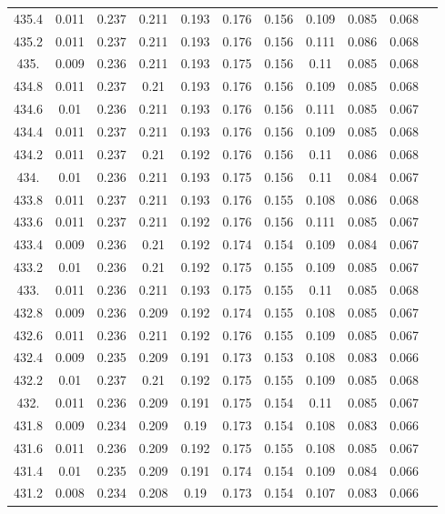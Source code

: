 \documentclass[12pt]{ctexart}
\numberwithin{equation}{section}
\begin{document}
\begin{longtable}{ccccccccccc}
435.4	&	0.011	&	0.237	&	0.211	&	0.193	&	0.176	&	0.156	&	0.109	&	0.085	&	0.068	\\
435.2	&	0.011	&	0.237	&	0.211	&	0.193	&	0.176	&	0.156	&	0.111	&	0.086	&	0.068	\\
435.	&	0.009	&	0.236	&	0.211	&	0.193	&	0.175	&	0.156	&	0.11	&	0.085	&	0.068	\\
434.8	&	0.011	&	0.237	&	0.21	&	0.193	&	0.176	&	0.156	&	0.109	&	0.085	&	0.068	\\
434.6	&	0.01	&	0.236	&	0.211	&	0.193	&	0.176	&	0.156	&	0.111	&	0.085	&	0.067	\\
434.4	&	0.011	&	0.237	&	0.211	&	0.193	&	0.176	&	0.156	&	0.109	&	0.085	&	0.068	\\
434.2	&	0.011	&	0.237	&	0.21	&	0.192	&	0.176	&	0.156	&	0.11	&	0.086	&	0.068	\\
434.	&	0.01	&	0.236	&	0.211	&	0.193	&	0.175	&	0.156	&	0.11	&	0.084	&	0.067	\\
433.8	&	0.011	&	0.237	&	0.211	&	0.193	&	0.176	&	0.155	&	0.108	&	0.086	&	0.068	\\
433.6	&	0.011	&	0.237	&	0.211	&	0.192	&	0.176	&	0.156	&	0.111	&	0.085	&	0.067	\\
433.4	&	0.009	&	0.236	&	0.21	&	0.192	&	0.174	&	0.154	&	0.109	&	0.084	&	0.067	\\
433.2	&	0.01	&	0.236	&	0.21	&	0.192	&	0.175	&	0.155	&	0.109	&	0.085	&	0.067	\\
433.	&	0.011	&	0.236	&	0.211	&	0.193	&	0.175	&	0.155	&	0.11	&	0.085	&	0.068	\\
432.8	&	0.009	&	0.236	&	0.209	&	0.192	&	0.174	&	0.155	&	0.108	&	0.085	&	0.067	\\
432.6	&	0.011	&	0.236	&	0.211	&	0.192	&	0.176	&	0.155	&	0.109	&	0.085	&	0.067	\\
432.4	&	0.009	&	0.235	&	0.209	&	0.191	&	0.173	&	0.153	&	0.108	&	0.083	&	0.066	\\
432.2	&	0.01	&	0.237	&	0.21	&	0.192	&	0.175	&	0.155	&	0.109	&	0.085	&	0.068	\\
432.	&	0.011	&	0.236	&	0.209	&	0.191	&	0.175	&	0.154	&	0.11	&	0.085	&	0.067	\\
431.8	&	0.009	&	0.234	&	0.209	&	0.19	&	0.173	&	0.154	&	0.108	&	0.083	&	0.066	\\
431.6	&	0.011	&	0.236	&	0.209	&	0.192	&	0.175	&	0.155	&	0.108	&	0.085	&	0.067	\\
431.4	&	0.01	&	0.235	&	0.209	&	0.191	&	0.174	&	0.154	&	0.109	&	0.084	&	0.066	\\
431.2	&	0.008	&	0.234	&	0.208	&	0.19	&	0.173	&	0.154	&	0.107	&	0.083	&	0.066	\\

\end{longtable}
\end{document}
